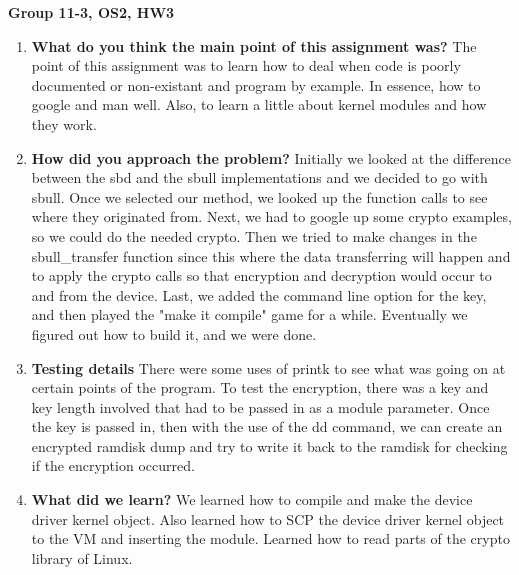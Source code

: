 \documentclass[IEEEtran,letterpaper,10pt,notitlepage,draftclsnofoot,onecolumn]{article}
\begin{document}
\textbf{Group 11-3, OS2, HW3}

\begin{enumerate}
\item 
\textbf{What do you think the main point of this assignment was?}
The point of this assignment was to learn how to deal when
code is poorly documented or non-existant and program by example.
In essence, how to google and man well.
Also, to learn a little about kernel modules and how they work.

\item 
\textbf{How did you approach the problem?}
Initially we looked at the difference between the sbd and 
the sbull implementations and we decided to go with sbull.
Once we selected our method, we looked up the function calls
to see where they originated from. Next, we had to 
google up some crypto examples, so we could do the needed
crypto. Then we tried to make changes in the sbull\_transfer 
function since this where the data transferring will happen 
and to apply the crypto calls so that encryption and decryption 
would occur to and from the device. Last, we added the command 
line option for the key, and then played the "make it compile"
game for a while. Eventually we figured out how to build it, 
and we were done.

\item
\textbf{Testing details}
There were some uses of printk to see what was going on at
certain points of the program. To test the encryption, there was a
key and key length involved that had to be passed in as a module
parameter. Once the key is passed in, then with the use of the dd
command, we can create an encrypted ramdisk dump and try to
write it back to the ramdisk for checking if the encryption occurred.

\item
\textbf{What did we learn?}
We learned how to compile and make the device driver kernel object.
Also learned how to SCP the device driver kernel object to the VM and
inserting the module. Learned how to read parts of the crypto library of
Linux.


\end{enumerate}
\end{document}
